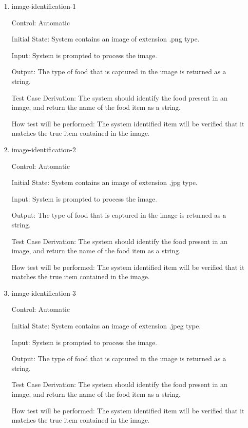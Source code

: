 \documentclass[12pt, titlepage]{article}
\begin{document}
\begin{enumerate}
	
	\item{image-identification-1\\}
	
	Control: Automatic
	
	Initial State: System contains an image of extension .png type.
	
	Input: System is prompted to process the image.
	
	Output: The type of food that is captured in the image is returned as a string.
	
	Test Case Derivation: The system should identify the food present in an image, and return the name of the food item as a string.
	
	How test will be performed: The system identified item will be verified that it matches the true item contained in the image.
	
	\item{image-identification-2\\}

	Control: Automatic
	
	Initial State: System contains an image of extension .jpg type.
	
	Input: System is prompted to process the image.
	
	Output: The type of food that is captured in the image is returned as a string.
	
	Test Case Derivation: The system should identify the food present in an image, and return the name of the food item as a string.
	
	How test will be performed: The system identified item will be verified that it matches the true item contained in the image.
	
	\item{image-identification-3\\}
	
	Control: Automatic
	
	Initial State: System contains an image of extension .jpeg type.
	
	Input: System is prompted to process the image.
	
	Output: The type of food that is captured in the image is returned as a string.
	
	Test Case Derivation: The system should identify the food present in an image, and return the name of the food item as a string.
	
	How test will be performed: The system identified item will be verified that it matches the true item contained in the image.
	
\end{enumerate}
\end{document}
